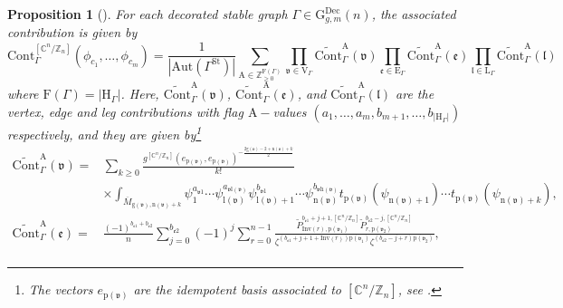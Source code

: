 \documentclass[12pt]{amsart}
\newtheorem{prop}{Proposition}[section]
\numberwithin{equation}{section}
\newcommand{\CnZn}{[\mathbb{C}^n/\mathbb{Z}_n]}
\begin{document}
\begin{prop}[\cite{gt}]\label{prop:CnZn_ 
  contributions}
For each decorated stable graph $\Gamma\in\mathrm{G}_{g,m}^{\text{Dec}}(n)$, the associated contribution is given by
\begin{equation*}
\mathrm{Cont}_{\Gamma}^{\CnZn}\left(\phi_{c_{1}}, \ldots, \phi_{c_{m}}\right)=\frac{1}{|\mathrm{Aut}(\Gamma^{\mathrm{St}})|} \sum_{\mathrm{A} \in \mathbb{Z}_{\geq 0}^{\mathrm{F}(\Gamma)}} \prod_{\mathfrak{v} \in \mathrm{V}_{\Gamma}} \widetilde{\mathrm{Cont}}_{\Gamma}^{\mathrm{A}}(\mathfrak{v}) \prod_{\mathfrak{e}\in \mathrm{E}_{\Gamma}} \widetilde{\mathrm{Cont}}_{\Gamma}^{\mathrm{A}}(\mathfrak{e}) \prod_{\mathfrak{l} \in \mathrm{L}_{\Gamma}} \widetilde{\mathrm{Cont}}_{\Gamma}^{\mathrm{A}}(\mathfrak{l})
\end{equation*}
where $\mathrm{F}(\Gamma)=\left\vert\mathrm{H}_{\Gamma}\right\vert$. Here, $\widetilde{\mathrm{Cont}}_{\Gamma}^{\mathrm{A}}(\mathfrak{v})$, $\widetilde{\mathrm{Cont}}_{\Gamma}^{\mathrm{A}}(\mathfrak{e})$, and $\widetilde{\mathrm{Cont}}_{\Gamma}^{\mathrm{A}}(\mathfrak{l})$ are the {\em vertex}, {\em edge} and {\em leg} contributions with flag $\mathrm{A}-$values $(a_1,\ldots,a_m,b_{m+1},\ldots,b_{\left\vert\mathrm{H}_{\Gamma}\right\vert})$ respectively, and they are given by\footnote{The vectors ${e}_{\mathrm{p}(\mathfrak{v})}$ are the idempotent basis associated to $\CnZn$, see \cite{gt}.}
\begin{equation*}
\begin{split}
    \widetilde{\mathrm{Cont}}_{\Gamma}^{\mathrm{A}}(\mathfrak{v})
    =&\sum_{k \geq 0} \frac{g^{\CnZn}({e}_{\mathrm{p}(\mathfrak{v})},{e}_{\mathrm{p}(\mathfrak{v})})^{-\frac{2\mathrm{g}(\mathfrak{v})-2+\mathrm{n}(\mathfrak{v})+k}{2}}}{k !}\\
    &\times\int_{\overline{M}_{\mathrm{g}(\mathfrak{v}),\mathrm{n}(\mathfrak{v})+k}}\psi_1^{a_{\mathfrak{v}1}}\cdots\psi_{\mathrm{l}(\mathfrak{v})}^{a_{\mathfrak{v}\mathrm{l}(\mathfrak{v})}}\psi_{\mathrm{l}(\mathfrak{v})+1}^{b_{\mathfrak{v}1}}\cdots\psi_{\mathrm{n}(\mathfrak{v})}^{b_{\mathfrak{v}\mathrm{h}(\mathfrak{v})}}t_{\mathrm{p}(\mathfrak{v})}(\psi_{\mathrm{n}(\mathfrak{v})+1})\cdots t_{\mathrm{p}(\mathfrak{v})}(\psi_{\mathrm{n}(\mathfrak{v})+k}),\\
    \widetilde{\mathrm{Cont}}_{\Gamma}^{\mathrm{A}}(\mathfrak{e})
    =&\frac{(-1)^{b_{\mathfrak{e}1}+b_{\mathfrak{e}2}}}{n} \sum_{j=0}^{b_{\mathfrak{e}2}}(-1)^{j} \sum_{r=0}^{n-1}\frac{\widetilde{P}_{\mathrm{Inv}(r),\mathrm{p}(\mathfrak{v}_1)}^{b_{\mathfrak{e}1}+j+1,\CnZn}\widetilde{P}_{r,\mathrm{p}(\mathfrak{v}_2)}^{b_{\mathfrak{e}2}-j,\CnZn}}{\zeta^{(b_{\mathfrak{e}1}+j+1+\mathrm{Inv}(r))\mathrm{p}(\mathfrak{v}_1)}\zeta^{(b_{\mathfrak{e}2}-j+r)\mathrm{p}(\mathfrak{v}_2)}},\\

\end{split}
\end{equation*}
\end{prop}
\end{document}
